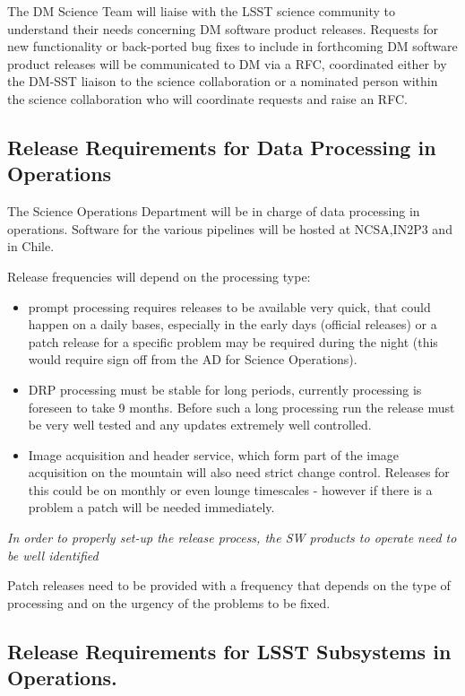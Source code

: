 The \gls{DM} Science Team will liaise with the \gls{LSST} science community to understand their needs concerning \gls{DM} software product releases. 
Requests for new functionality or back-ported bug fixes to include in forthcoming \gls{DM} software product releases will be communicated to \gls{DM} via a \gls{RFC}, coordinated either by the DM-SST liaison to the science collaboration or a nominated person within the science collaboration who will coordinate requests and raise an \gls{RFC}. 

\subsection{Release Requirements for Data Processing in Operations} \label{sec:procreqs}

The Science Operations Department will be in charge of  data processing in operations. 
Software for the various pipelines will be hosted at \gls{NCSA},IN2P3 and in Chile.

Release frequencies will depend on the processing type:
\begin{itemize}
\item prompt processing requires releases to be available very quick, that could happen on a daily bases, especially in the early days (official releases)
 or a  patch release  for a specific problem may be required during the night (this would require sign off from the \gls{AD} for Science Operations).
\item \gls{DRP} processing  must be stable for long periods, currently processing is foreseen to take 9 months.  Before such a long processing run the release must be very well tested and any updates extremely well controlled.
\item Image acquisition and header service, which form part of the image acquisition on the mountain will also need strict change control. Releases for this could be on monthly or even lounge timescales - however if there is a problem a patch will be needed immediately.
\end{itemize}

\textit{In order to properly set-up the release process, the \gls{SW} products to operate need to be well identified}

Patch releases need to be provided with a frequency that depends on the type of processing
and on the urgency of the problems to be fixed.

\subsection{Release Requirements for \gls{LSST} Subsystems in Operations.} \label{sec:otherreqs}

